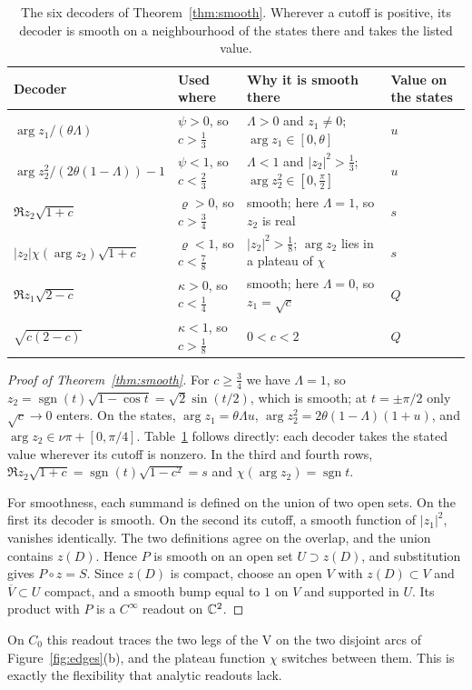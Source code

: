 \documentclass[11pt]{article}
\theoremstyle{definition}\newtheorem{definition}[theorem]{Definition}
\theoremstyle{remark}\newtheorem{remark}[theorem]{Remark}
\DeclareMathOperator{\sgn}{sgn}\DeclareMathOperator{\rank}{rank}
\begin{document}
\begin{table}[ht]\centering\small\renewcommand{\arraystretch}{1.45}
\begin{tabular}{>{\raggedright\arraybackslash}p{.22\linewidth}>{\raggedright\arraybackslash}p{.19\linewidth}>{\raggedright\arraybackslash}p{.36\linewidth}>{\raggedright\arraybackslash}p{.11\linewidth}}\toprule
Decoder & Used where & Why it is smooth there & Value on the states\\\midrule
$\arg z_1/(\theta\Lambda)$ & $\psi>0$, so $c>\frac13$ & $\Lambda>0$ and $z_1\neq0$; $\arg z_1\in[0,\theta]$ & $u$\\
$\arg z_2^2/(2\theta(1-\Lambda))-1$ & $\psi<1$, so $c<\frac23$ & $\Lambda<1$ and $|z_2|^2>\frac13$; $\arg z_2^2\in[0,\frac\pi2]$ & $u$\\
$\Re z_2\sqrt{1+c}$ & $\varrho>0$, so $c>\frac34$ & smooth; here $\Lambda=1$, so $z_2$ is real & $s$\\
$|z_2|\chi(\arg z_2)\sqrt{1+c}$ & $\varrho<1$, so $c<\frac78$ & $|z_2|^2>\frac18$; $\arg z_2$ lies in a plateau of $\chi$ & $s$\\
$\Re z_1\sqrt{2-c}$ & $\kappa>0$, so $c<\frac14$ & smooth; here $\Lambda=0$, so $z_1=\sqrt c$ & $Q$\\
$\sqrt{c(2-c)}$ & $\kappa<1$, so $c>\frac18$ & $0<c<2$ & $Q$\\\bottomrule
\end{tabular}
\caption{The six decoders of Theorem~\ref{thm:smooth}. Wherever a cutoff is
positive, its decoder is smooth on a neighbourhood of the states there and
takes the listed value.}
\label{tab:decoders}
\end{table}

\begin{proof}[Proof of Theorem~\ref{thm:smooth}]
For $c\geq\frac34$ we have $\Lambda=1$, so
$z_2=\sgn(t)\sqrt{1-\cos t}=\sqrt2\sin(t/2)$, which is smooth; at $t=\pm\pi/2$
only $\sqrt c\to0$ enters. On the states,
$\arg z_1=\theta\Lambda u$, $\arg z_2^2=2\theta(1-\Lambda)(1+u)$, and
$\arg z_2\in\nu\pi+[0,\pi/4]$. Table~\ref{tab:decoders} follows directly: each
decoder takes the stated value wherever its cutoff is nonzero. In the third and
fourth rows, $\Re z_2\sqrt{1+c}=\sgn(t)\sqrt{1-c^2}=s$ and
$\chi(\arg z_2)=\sgn t$.

For smoothness, each summand is defined on the union of two open sets. On the
first its decoder is smooth. On the second its cutoff, a smooth function of
$|z_1|^2$, vanishes identically. The two definitions agree on the overlap, and
the union contains $z(D)$. Hence $P$ is smooth on an open set $U\supset z(D)$,
and substitution gives $P\circ z=S$. Since $z(D)$ is compact, choose an open
$V$ with $z(D)\subset V$ and $\overline V\subset U$ compact, and a smooth bump equal
to $1$ on $V$ and supported in $U$. Its product with $P$ is a $C^\infty$
readout on $\mathbb C^2$.
\end{proof}
On $C_0$ this readout traces the two legs of the V on the two disjoint arcs of
Figure~\ref{fig:edges}(b), and the plateau function $\chi$ switches between
them. This is exactly the flexibility that analytic readouts lack.
\end{document}
